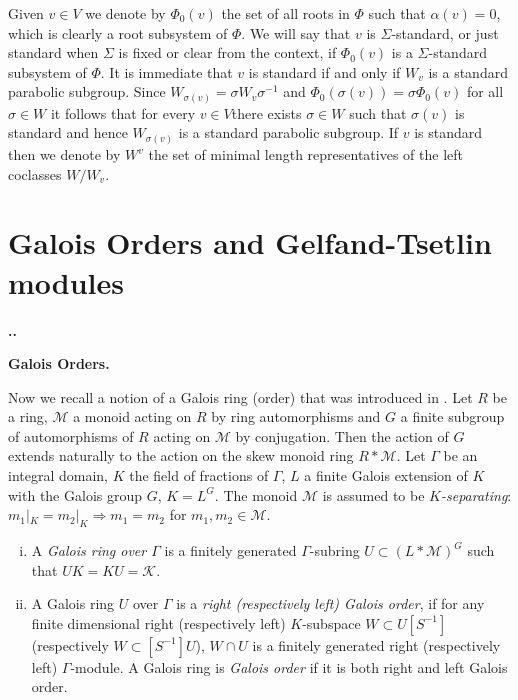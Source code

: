 \documentclass[11pt,fleqn]{amsart}
\renewcommand\thesection{\arabic{section}}
\newcounter{para}[section]
\renewcommand\thepara{\thesection.\arabic{para}}
\def\paragraph{%
 \noindent
 \refstepcounter{para}%
 \textbf{\thepara.}\hspace{1ex}%
}
\newcommand\about[1]{%
 {\bfseries#1.}%
}
\begin{document}
Given $v \in V$ we denote by $\Phi_0(v)$ the set of all roots in $\Phi$ such 
that $\alpha(v) = 0$, which is clearly a root subsystem of $\Phi$. We will say 
that $v$ is $\Sigma$-standard, or just standard when $\Sigma$ is fixed or 
clear from the context, if $\Phi_0(v)$ is a $\Sigma$-standard subsystem of 
$\Phi$. It is immediate that $v$ is standard if and only if $W_v$ is a 
standard parabolic subgroup. Since $W_{\sigma(v)} = \sigma W_v \sigma^{-1}$ 
and $\Phi_0(\sigma(v)) = \sigma \Phi_0(v)$ for all $\sigma \in W$ it follows 
that for every $v \in V$there exists $\sigma \in W$ such that $\sigma(v)$ is 
standard and hence $W_{\sigma(v)}$ is a standard parabolic subgroup. If $v$ is 
standard then we denote by $W^v$ the set of minimal length representatives of 
the left coclasses $W/W_v$.


\section{Galois Orders and Gelfand-Tsetlin modules}

\paragraph
\about{Galois Orders}
Now we recall a notion of a Galois ring (order) that was introduced in 
\cite{FO-galois-orders}. Let $R$ be a ring, $\mathcal M$ a monoid acting on 
$R$ by ring automorphisms and $G$ a finite subgroup of automorphisms of $R$ 
acting on $\mathcal M$ by conjugation. Then the action of $G$ extends 
naturally to the action on the skew monoid ring $R* \mathcal M$. Let $\Gamma$ 
be an integral domain, $K$ the field of fractions of $\Gamma$, $L$ a finite 
Galois extension of $K$ with the Galois group $G$, $K=L^G$. The monoid
$\mathcal M$ is assumed to be \emph{$K$-separating}: $m_1|_K=m_2|_K
\Rightarrow m_1=m_2$ for $m_1,m_2\in\mathcal M$.
 
\begin{Definition}
\begin{enumerate}[(i)]
\item A \emph{Galois ring over $\Gamma$} is a finitely generated 
$\Gamma$-subring $U\subset (L\ast\mathcal M)^G$ such that $UK=KU=\mathcal{K}$.

\item A Galois ring $U$ over $\Gamma$ is a \emph{right (respectively left) 
Galois order}, if for any finite dimensional right (respectively left) 
$K$-subspace $W\subset U[S^{-1}]$ (respectively $W\subset [S^{-1}]U$), 
$W \cap U$ is a finitely generated right (respectively left) $\Gamma$-module. A
Galois ring is \emph{Galois order}{} if it is both right and left Galois order.
\end{enumerate}
\end{Definition}
\end{document}
